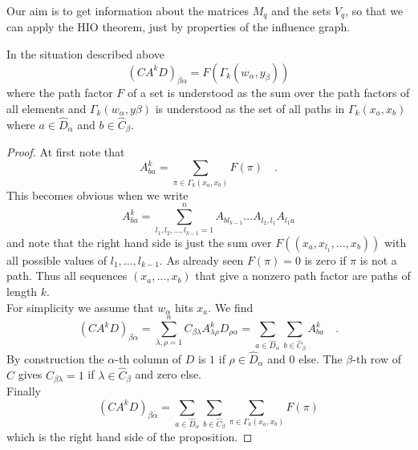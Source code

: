 Our aim is to get information about the matrices $M_q$ and the sets $V_q$, so that we can 
apply the HIO theorem, just by properties of the influence graph.
\begin{proposition}{}{}
	In the situation described above
	\begin{equation}
	(CA^kD)_{\beta\alpha} = F\left( \Gamma_k(w_\alpha,y_\beta) 
	\right)
	\end{equation}
	where the path factor $F$ of a set is understood as the sum over the path factors of all 
	elements and $\Gamma_k(w_\alpha,y\beta)$ is understood as the set of all paths in 
	$\Gamma_k(x_a,x_b)$ where $a\in\hat{D}_\alpha$ and $b\in\hat{C}_\beta$.
\end{proposition}
\begin{proof}
	At first note that
	\begin{equation}
	A^k_{ba} = \sum\limits_{\pi\in\Gamma_k(x_a,x_b) } F(\pi) \quad .
	\end{equation}
	This becomes obvious when we write
	\begin{equation}
	A^k_{ba} = \sum\limits_{l_1,l_2,\ldots,l_{k-1}=1}^n
	A_{bl_{k-1}} \ldots A_{l_2,l_1}  A_{l_1a}
	\end{equation}
	and note that the right hand side is just the sum over $F((x_a,x_{l_1},\ldots ,x_b))$ 
	with all possible values of $l_1,\ldots,l_{k-1}$. As already seen $F(\pi)=0$ is zero 
	if $\pi$ is not a path. Thus all sequences $(x_a,\ldots,x_b)$ that give a nonzero 
	path factor are paths of length $k$.\\
	
	For simplicity we assume that $w_\alpha$ hits $x_a$. We find
	\begin{equation}
	(CA^kD)_{\beta\alpha} = \sum\limits_{\lambda,\rho = 1}^n C_{\beta\lambda}A^k_{\lambda\rho} 
	D_{\rho\alpha} 
	= \sum\limits_{a\in\hat{D}_\alpha}\sum\limits_{b\in\hat{C}_\beta} A^k_{ba} \quad .
	\end{equation}
	By construction the $\alpha$-th column of $D$ is $1$ if $\rho\in \hat{D}_\alpha$ 
	and $0$ else. The $\beta$-th row of $C$ gives 
	$C_{\beta\lambda}=1$ if $\lambda\in\hat{C}_\beta$ and zero else.\\
	
	Finally
	\begin{equation}
	(CA^kD)_{\beta\alpha} =\sum\limits_{a\in\hat{D}_\alpha}
	 \sum\limits_{b\in\hat{C}_\beta}\sum\limits_{\pi\in\Gamma_k(x_a,x_b)} F(\pi) 
	\end{equation}
	which is the right hand side of the proposition.
\end{proof}

